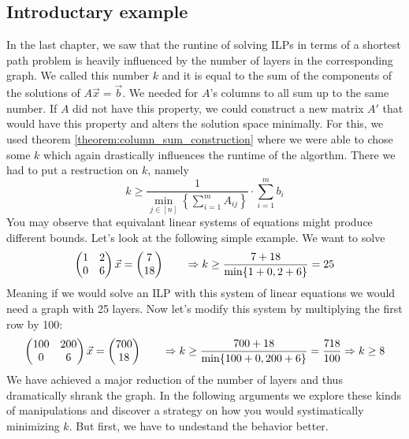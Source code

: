 \subsection{Introductary example}
In the last chapter, we saw that the runtine of solving ILPs in terms of a shortest path problem is heavily influenced by the number of layers in the corresponding graph. We called this number $k$ and it is equal to the sum of the components of the solutions of $A\vec x=\vec b$. We needed for $A$'s columns to all sum up to the same number. If $A$ did not have this property, we could construct a new matrix $A'$ that would have this property and alters the solution space minimally. For this, we used theorem \ref{theorem:column_sum_construction} where we were able to chose some $k$ which again drastically influences the runtime of the algorthm. There we had to put a restruction on $k$, namely
$$k \geq \frac{1}{\min_{j \in [n]} \left\{ \sum_{i=1}^{m}A_{ij}\right\}}\cdot \sum_{i=1}^{m}b_i$$
You may observe that equivalant linear systems of equations might produce different bounds. Let's look at the following simple example. We want to solve 
$$\left(\begin{matrix}1&2\\0&6\end{matrix}\right)\vec x = \left(\begin{matrix}7\\18\end{matrix}\right) \qquad \Rightarrow k \geq \frac{7 + 18}{\min\{1+0, 2+6\}} = 25$$
Meaning if we would solve an ILP with this system of linear equations we would need a graph with 25 layers. Now let's modify this system by multiplying the first row by 100:
$$\left(\begin{matrix}100&200\\0&6\end{matrix}\right)\vec x = \left(\begin{matrix}700\\18\end{matrix}\right) \qquad \Rightarrow k \geq \frac{700 + 18}{\min\{100+0, 200+6\}} = \frac{718}{100} \Rightarrow k \geq 8$$
We have achieved a major reduction of the number of layers and thus dramatically shrank the graph. In the following arguments we explore these kinds of manipulations and discover a strategy on how you would systimatically minimizing $k$. But first, we have to undestand the behavior better.

